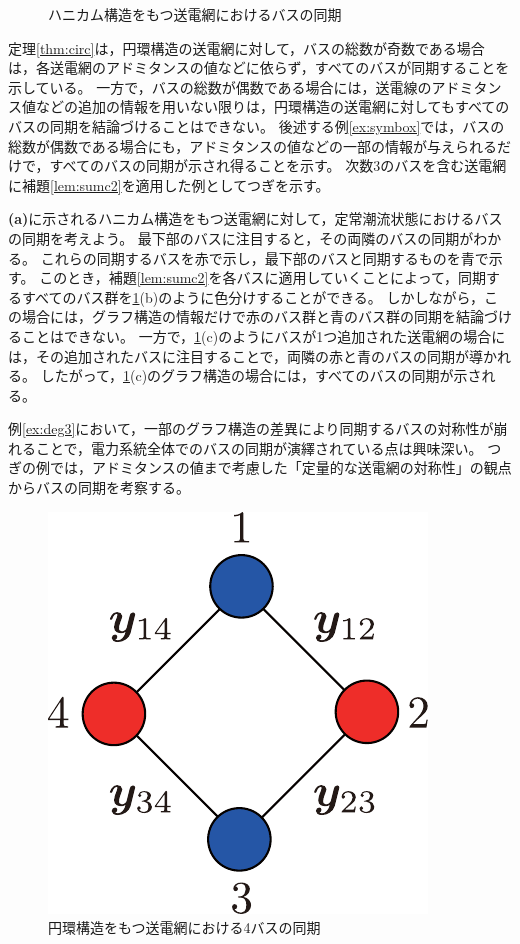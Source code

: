 \documentclass[tombow,dvipdfmx]{corona-a5-1.1}
\begin{document}
\begin{figure}[t]
{\begin{minipage}{0.3\linewidth}
    \subcaption{  }
  \end{minipage}
  \caption{ハニカム構造をもつ送電網におけるバスの同期}
  \label{fig:hony}
  }
\end{figure}

定理\ref{thm:circ}は，円環構造の送電網に対して，バスの総数が奇数である場合は，各送電網のアドミタンスの値などに依らず，すべてのバスが同期することを示している。
一方で，バスの総数が偶数である場合には，送電線のアドミタンス値などの追加の情報を用いない限りは，円環構造の送電網に対してもすべてのバスの同期を結論づけることはできない。
後述する例\ref{ex:symbox}では，バスの総数が偶数である場合にも，アドミタンスの値などの一部の情報が与えられるだけで，すべてのバスの同期が示され得ることを示す。
次数3のバスを含む送電網に補題\ref{lem:sumc2}を適用した例としてつぎを示す。

\begin{例}[ハニカム構造の送電網におけるバスの同期]\label{ex:deg3}
\textbf{(a)}に示されるハニカム構造をもつ送電網に対して，定常潮流状態におけるバスの同期を考えよう。
最下部のバスに注目すると，その両隣のバスの同期がわかる。
これらの同期するバスを赤で示し，最下部のバスと同期するものを青で示す。
このとき，補題\ref{lem:sumc2}を各バスに適用していくことによって，同期するすべてのバス群を\ref{fig:hony}(b)のように色分けすることができる。
しかしながら，この場合には，グラフ構造の情報だけで赤のバス群と青のバス群の同期を結論づけることはできない。
一方で，\ref{fig:hony}(c)のようにバスが1つ追加された送電網の場合には，その追加されたバスに注目することで，両隣の赤と青のバスの同期が導かれる。
したがって，\ref{fig:hony}(c)のグラフ構造の場合には，すべてのバスの同期が示される。
\end{例}

例\ref{ex:deg3}において，一部のグラフ構造の差異により同期するバスの対称性が崩れることで，電力系統全体でのバスの同期が演繹されている点は興味深い。
つぎの例では，アドミタンスの値まで考慮した「定量的な送電網の対称性」の観点からバスの同期を考察する。

\begin{figure}[t]
\centering
\includegraphics[width = .20\linewidth]{figs/4busbox}
\caption{円環構造をもつ送電網における4バスの同期}
\label{fig:4busbox}
\end{figure}
\end{document}
